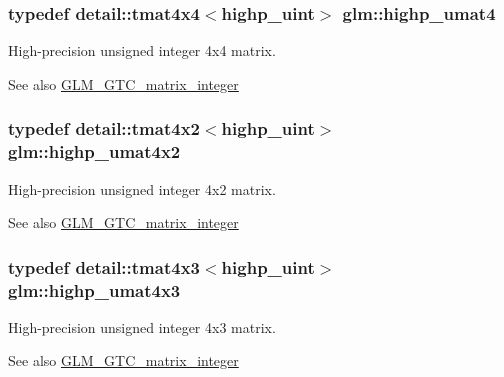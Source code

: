 \subsubsection[{highp\+\_\+umat4}]{\setlength{\rightskip}{0pt plus 5cm}typedef detail\+::tmat4x4$<$highp\+\_\+uint$>$ {\bf glm\+::highp\+\_\+umat4}}\label{group__gtc__matrix__integer_gabf91e4747e9aad3d2b58c79da5d9b0d3}
High-\/precision unsigned integer 4x4 matrix. \begin{DoxySeeAlso}{See also}
\hyperlink{group__gtc__matrix__integer}{G\+L\+M\+\_\+\+G\+T\+C\+\_\+matrix\+\_\+integer} 
\end{DoxySeeAlso}
\hypertarget{group__gtc__matrix__integer_gaa9500361295c8c2fd8bee2b77491a405}{}
\subsubsection[{highp\+\_\+umat4x2}]{\setlength{\rightskip}{0pt plus 5cm}typedef detail\+::tmat4x2$<$highp\+\_\+uint$>$ {\bf glm\+::highp\+\_\+umat4x2}}\label{group__gtc__matrix__integer_gaa9500361295c8c2fd8bee2b77491a405}
High-\/precision unsigned integer 4x2 matrix. \begin{DoxySeeAlso}{See also}
\hyperlink{group__gtc__matrix__integer}{G\+L\+M\+\_\+\+G\+T\+C\+\_\+matrix\+\_\+integer} 
\end{DoxySeeAlso}
\hypertarget{group__gtc__matrix__integer_ga6de5237bcae8a908a095d97d3ca74bdd}{}
\subsubsection[{highp\+\_\+umat4x3}]{\setlength{\rightskip}{0pt plus 5cm}typedef detail\+::tmat4x3$<$highp\+\_\+uint$>$ {\bf glm\+::highp\+\_\+umat4x3}}\label{group__gtc__matrix__integer_ga6de5237bcae8a908a095d97d3ca74bdd}
High-\/precision unsigned integer 4x3 matrix. \begin{DoxySeeAlso}{See also}
\hyperlink{group__gtc__matrix__integer}{G\+L\+M\+\_\+\+G\+T\+C\+\_\+matrix\+\_\+integer} 
\end{DoxySeeAlso}
\hypertarget{group__gtc__matrix__integer_ga8600f9e6e566b3dee70de37dafd2bd8c}{}
